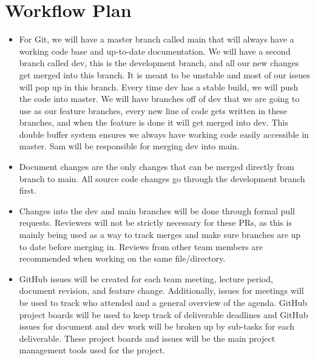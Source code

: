 \documentclass{article}
\begin{document}
\section{Workflow Plan}

\begin{itemize}
	\item For Git, we will have a master branch called main that will always have a working code base and up-to-date documentation. We will have a second branch called dev, this is the development branch, and all our new changes get merged into this branch. It is meant to be unstable and most of our issues will pop up in this branch. Every time dev has a stable build, we will push the code into master. We will have branches off of dev that we are going to use as our feature branches, every new line of code gets written in these branches, and when the feature is done it will get merged into dev. This double buffer system ensures we always have working code easily accessible in master. Sam will be responsible for merging dev into main. 
 \item Document changes are the only changes that can be merged directly from branch to main. All source code changes go through the development branch first.
    \item Changes into the dev and main branches will be done through formal pull requests. Reviewers will not be strictly necessary for these PRs, as this is mainly being used as a way to track merges and make sure branches are up to date before merging in. Reviews from other team members are recommended when working on the same file/directory. 
	\item GitHub issues will be created for each team meeting, lecture period, document revision, and feature change. Additionally, issues for meetings will be used to track who attended and a general overview of the agenda. GitHub project boards will be used to keep track of deliverable deadlines and GitHub issues for document and dev work will be broken up by sub-tasks for each deliverable. These project boards and issues will be the main project management tools used for the project.
\end{itemize}
\end{document}
